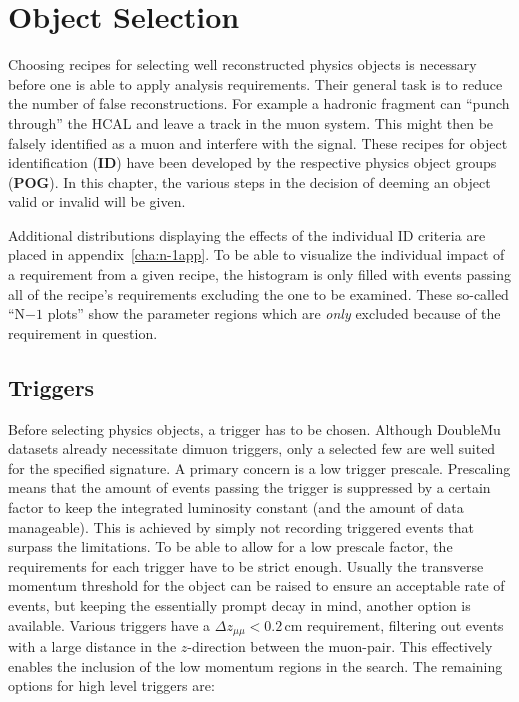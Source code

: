 \chapter{Object Selection}
\label{cha:objsel}

Choosing recipes for selecting well reconstructed physics objects is necessary before one is able to apply analysis requirements. Their general task is to reduce the number of false reconstructions. For example a hadronic fragment can ``punch through'' the HCAL and leave a track in the muon system. This might then be falsely identified as a muon and interfere with the signal. These recipes for object identification (\textbf{ID}) have been developed by the respective physics object groups (\textbf{POG}). In this chapter, the various steps in the decision of deeming an object valid or invalid will be given.

Additional distributions displaying the effects of the individual ID criteria are placed in appendix~\ref{cha:n-1app}. To be able to visualize the individual impact of a requirement from a given recipe, the histogram is only filled with events passing all of the recipe's requirements excluding the one to be examined. These so-called ``N$ - 1$ plots'' show the parameter regions which are \textit{only} excluded because of the requirement in question.

\section{Triggers}
\label{sec:trigger}

Before selecting physics objects, a trigger has to be chosen. Although DoubleMu datasets already necessitate dimuon triggers, only a selected few are well suited for the specified signature. A primary concern is a low trigger prescale. Prescaling means that the amount of events passing the trigger is suppressed by a certain factor to keep the integrated luminosity constant (and the amount of data manageable). This is achieved by simply not recording triggered events that surpass the limitations. To be able to allow for a low prescale factor, the requirements for each trigger have to be strict enough. Usually the transverse momentum threshold for the object can be raised to ensure an acceptable rate of events, but keeping the essentially prompt decay in mind, another option is available. Various triggers have a $\Delta z_{\mu\mu} < 0.2\,\text{cm}$ requirement, filtering out events with a large distance in the $z$-direction between the muon-pair. This effectively enables the inclusion of the low momentum regions in the search. The remaining options for high level triggers are:

